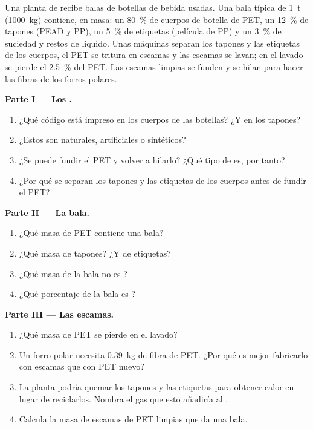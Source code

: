 \begin{problem}
\label{pb:g8:plastics:1}
Una planta de  recibe balas de botellas de bebida usadas. Una
bala típica de \qty{1}{t} (\qty{1000}{kg}) contiene, en masa: un
\qty{80}{\percent} de cuerpos de botella de PET, un \qty{12}{\percent}
de tapones (PEAD y PP), un \qty{5}{\percent} de etiquetas (película de
PP) y un \qty{3}{\percent} de suciedad y restos de líquido. Unas
máquinas separan los tapones y las etiquetas de los cuerpos, el PET se
tritura en escamas y las escamas se lavan; en el lavado se pierde el
\qty{2.5}{\percent} del PET. Las escamas limpias se funden y se hilan
para hacer las fibras de los forros polares.

\medskip
\noindent\textbf{Parte I --- Los .}
\begin{enumerate}
  \item ¿Qué código está impreso en los cuerpos de las botellas? ¿Y en
        los tapones?
  \item ¿Estos  son naturales, artificiales o sintéticos?
  \item ¿Se puede fundir el PET y volver a hilarlo? ¿Qué tipo de
         es, por tanto?
  \item ¿Por qué se separan los tapones y las etiquetas de los cuerpos
        antes de fundir el PET?
\end{enumerate}

\medskip
\noindent\textbf{Parte II --- La bala.}
\begin{enumerate}[resume]
  \item ¿Qué masa de PET contiene una bala?
  \item ¿Qué masa de tapones? ¿Y de etiquetas?
  \item ¿Qué masa de la bala no es ?
  \item ¿Qué porcentaje de la bala es ?
\end{enumerate}

\medskip
\noindent\textbf{Parte III --- Las escamas.}
\begin{enumerate}[resume]
  \item ¿Qué masa de PET se pierde en el lavado?
  \item Un forro polar necesita \qty{0.39}{kg} de fibra de PET. ¿Por qué
        es mejor fabricarlo con escamas que con PET nuevo?
  \item La planta podría quemar los tapones y las etiquetas para obtener
        calor en lugar de reciclarlos. Nombra el gas que esto añadiría
        al .
  \item Calcula la masa de escamas de PET limpias que da una bala.
\end{enumerate}
\end{problem}
